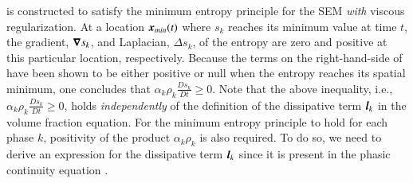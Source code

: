  is constructed to satisfy the minimum entropy principle for the SEM \emph{with} viscous regularization. 
At a location $\boldsymbol x_{min}(t)$ where $s_k$ reaches its minimum value at time $t$, the gradient, $\boldsymbol\nabla s_k$, and Laplacian, $\Delta s_k$, 
of the entropy are zero and positive at this particular location, respectively. Because the terms on the right-hand-side of 
 have been shown to be either positive or null when 
the entropy reaches its spatial minimum, one concludes that $\alpha_k \rho_k \frac{D s_k}{Dt} \geq 0$. Note that the above inequality, 
i.e., $\alpha_k \rho_k \frac{D s_k}{Dt} \geq 0$, holds {\it independently} of the definition of the dissipative term $\boldsymbol l_k$
in the volume fraction equation. For the minimum entropy principle to hold for each phase $k$, positivity of the product $\alpha_k \rho_k$ is also required. 
To do so, we need to derive an expression for the dissipative term $\boldsymbol l_k$ since it is present in the phasic continuity equation .
%
